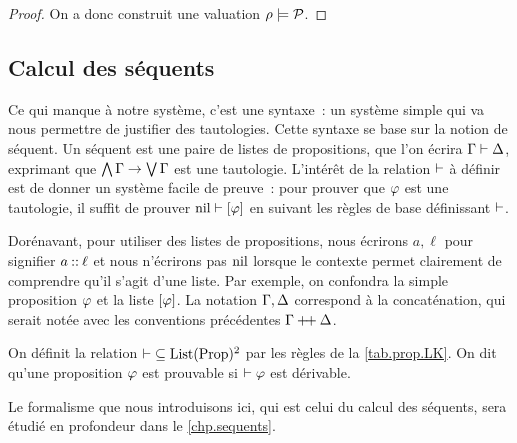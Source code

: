 \begin{proof}
  On a donc construit une valuation $\rho \models \mathcal P$.
\end{proof}

\subsection{Calcul des séquents}

Ce qui manque à notre système, c'est une syntaxe~: un système simple qui va nous
permettre de justifier des tautologies. Cette syntaxe se base sur la notion de
séquent. Un séquent est une paire de listes de propositions, que l'on écrira
$\Gamma\vdash \Delta$, exprimant que $\bigwedge \Gamma \to \bigvee \Gamma$ est
une tautologie. L'intérêt de la relation $\vdash$ à définir est de donner un
système facile de preuve~: pour prouver que $\varphi$ est une tautologie, il
suffit
de prouver $\operatorname{nil}\vdash [\varphi]$ en suivant les règles de base définissant
$\vdash$.

\begin{notation}
  Dorénavant, pour utiliser des listes de propositions, nous écrirons $a, \ell$
  pour signifier $a\mathbin{::} \ell$ et nous n'écrirons pas $\operatorname{nil}$ lorsque le contexte
  permet clairement de comprendre qu'il s'agit d'une liste. Par exemple, on
  confondra la simple proposition $\varphi$ et la liste $[\varphi]$. La notation
  $\Gamma,\Delta$ correspond à la concaténation, qui serait notée avec les
  conventions précédentes $\Gamma\mathbin{\mathord{+}\!\mathord{+}}\Delta$.
\end{notation}

\begin{definition}
  On définit la relation $\mathord{\vdash} \subseteq \operatorname{List}(\operatorname{Prop})^2$ par les
  règles de la \cref{tab.prop.LK}.
  On dit qu'une proposition $\varphi$ est prouvable si $\vdash\varphi$ est dérivable.
\end{definition}

\begin{remark}
  Le formalisme que nous introduisons ici, qui est celui du calcul des séquents,
  sera étudié en profondeur dans le \cref{chp.sequents}.
\end{remark}

